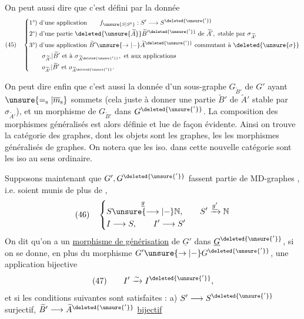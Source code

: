 On peut aussi dire que c'est défini par la donnée
\[
(45)\quad\left\{\begin{aligned}
&\text{1°) d'une application}\qquad f_{\unsure{S|S^0}}:S'\longrightarrow S^{\deleted{\unsure{'}}}\\
&\text{2°) d'une partie }\deleted{\unsure{\widetilde A}}\widetilde B'^{\deleted{\unsure{'}}}\text{ de }\widetilde A',\text{ stable par }\sigma_{\widetilde A'}\\
&\text{3°) d'une application }\widetilde B'\unsure{\to|{-}}\widetilde A^{\deleted{\unsure{'}}}\text{ commutant à }\deleted{\unsure{\sigma}}\\
&\qquad\sigma_{\widetilde A'}|\widetilde B'\text{ et à }\sigma_{\widetilde A^{\deleted{\unsure{'}}}},\text{ et aux applications}\\
&\qquad o_{\widetilde A'}|\widetilde B'\text{ et }o_{\widetilde A^{\deleted{\unsure{'}}}}.
\end{aligned}\right.
\]

On peut dire enfin que c'est aussi la donnée d'un sous-graphe $G_{\widetilde B'}$ de $G'$ ayant $\unsure{=_{\mathrm s}|\overline m_{\mathrm s}}$ sommets (cela  juste  à donner une partie $\widetilde B'$ de $\widetilde A'$ stable par $\sigma_{\widetilde A'}$), et un morphisme de $G_{\widetilde B'}$ dans $G^{\deleted{\unsure{'}}}$. La composition des morphismes généralisés est alors définie et lue de façon
évidente. Ainsi on trouve la catégorie  des graphes, dont les objets sont les graphes, les  les morphismes généralisés de graphes. On notera que les iso. dans cette nouvelle catégorie sont les iso au sens ordinaire.

Supposons maintenant que $G',G^{\deleted{\unsure{'}}}$ fassent partie de MD-graphes , i.e. soient munis de plus de ,
\[
(46)\quad\left\{\begin{aligned}
&S\overset{\underline g}{\unsure{\longrightarrow|{-}}}\mathbb N,\qquad S'\xrightarrow{\underline{g'}}\mathbb N\\
&I\longrightarrow S,\qquad I'\longrightarrow S'
\end{aligned}\right.
\]
On dit qu'on a un \uline{morphisme de générisation} de $\underline G'$ dans $\underline G^{\deleted{\unsure{'}}}$, si on se donne, en plus du morphisme  $G'\unsure{\to|{-}}G^{\deleted{\unsure{'}}}$, une application bijective
\[
(47)\qquad I'\xrightarrow{\sim}I^{\deleted{\unsure{'}}},
\]
 et si les conditions suivantes sont satisfaites :
a) $S'\longrightarrow S^{\deleted{\unsure{'}}}$ surjectif, $\widetilde B'\longrightarrow\widetilde A^{\deleted{\unsure{'}}}$ \uline{bijectif}

